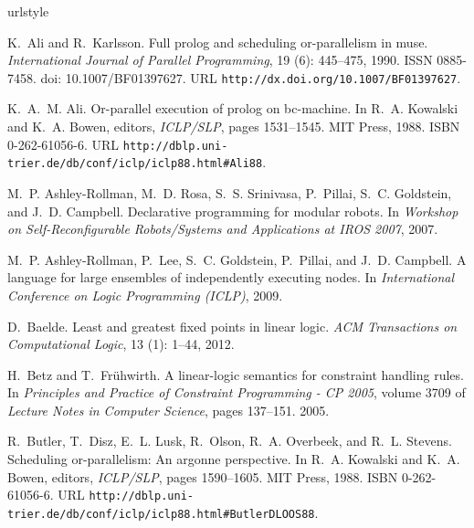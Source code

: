 \documentclass{sigplanconf}
\begin{document}
\begin{thebibliography}{35}
\providecommand{\natexlab}[1]{#1}
\providecommand{\url}[1]{\texttt{#1}}
\expandafter\ifx\csname urlstyle\endcsname\relax
  \providecommand{\doi}[1]{doi: #1}\else
  \providecommand{\doi}{doi: \begingroup \urlstyle{rm}\Url}\fi

K.~Ali and R.~Karlsson.
\newblock Full prolog and scheduling or-parallelism in muse.
\newblock \emph{International Journal of Parallel Programming}, 19
  (6): 445--475, 1990.
\newblock ISSN 0885-7458.
\newblock \doi{10.1007/BF01397627}.
\newblock URL \url{http://dx.doi.org/10.1007/BF01397627}.

K.~A.~M. Ali.
\newblock Or-parallel execution of prolog on bc-machine.
\newblock In R.~A. Kowalski and K.~A. Bowen, editors, \emph{ICLP/SLP}, pages
  1531--1545. MIT Press, 1988.
\newblock ISBN 0-262-61056-6.
\newblock URL \url{http://dblp.uni-trier.de/db/conf/iclp/iclp88.html#Ali88}.

M.~P. Ashley-Rollman, M.~D. Rosa, S.~S. Srinivasa, P.~Pillai, S.~C. Goldstein,
  and J.~D. Campbell.
\newblock Declarative programming for modular robots.
\newblock In \emph{Workshop on Self-Reconfigurable Robots/Systems and
  Applications at IROS 2007}, 2007.

M.~P. Ashley-Rollman, P.~Lee, S.~C. Goldstein, P.~Pillai, and J.~D. Campbell.
\newblock A language for large ensembles of independently executing nodes.
\newblock In \emph{International Conference on Logic Programming (ICLP)}, 2009.

D.~Baelde.
\newblock Least and greatest fixed points in linear logic.
\newblock \emph{ACM Transactions on Computational Logic}, 13
  (1): 1--44, 2012.

H.~Betz and T.~Fr{\"u}hwirth.
\newblock A linear-logic semantics for constraint handling rules.
\newblock In \emph{Principles and Practice of Constraint Programming - CP
  2005}, volume 3709 of \emph{Lecture Notes in Computer Science}, pages
  137--151. 2005.

R.~Butler, T.~Disz, E.~L. Lusk, R.~Olson, R.~A. Overbeek, and R.~L. Stevens.
\newblock Scheduling or-parallelism: An argonne perspective.
\newblock In R.~A. Kowalski and K.~A. Bowen, editors, \emph{ICLP/SLP}, pages
  1590--1605. MIT Press, 1988.
\newblock ISBN 0-262-61056-6.
\newblock URL
  \url{http://dblp.uni-trier.de/db/conf/iclp/iclp88.html#ButlerDLOOS88}.


\end{thebibliography}
\end{document}
